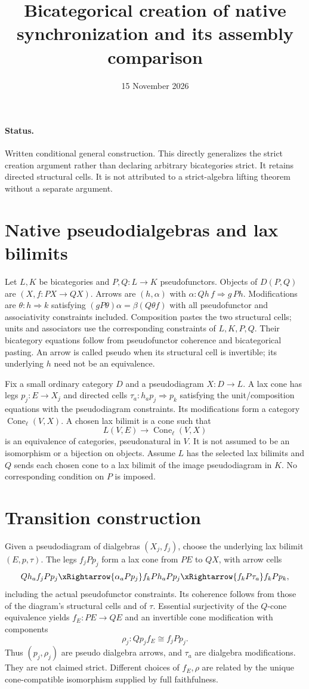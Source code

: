 \documentclass{article}
\title{Bicategorical creation of native synchronization and its assembly comparison}
\date{15 November 2026}
\begin{document}
\maketitle
\paragraph{Status.} Written conditional general construction. This directly generalizes the strict creation argument rather than declaring arbitrary bicategories strict. It retains directed structural cells. It is not attributed to a strict-algebra lifting theorem without a separate argument.

\section{Native pseudodialgebras and lax bilimits}
Let $L,K$ be bicategories and $P,Q:L\to K$ pseudofunctors. Objects of $D(P,Q)$ are $(X,f:PX\to QX)$. Arrows are $(h,\alpha)$ with $\alpha:Qh\,f\Rightarrow g\,Ph$. Modifications are $\theta:h\Rightarrow k$ satisfying $(gP\theta)\alpha=\beta(Q\theta f)$ with all pseudofunctor and associativity constraints included. Composition pastes the two structural cells; units and associators use the corresponding constraints of $L,K,P,Q$. Their bicategory equations follow from pseudofunctor coherence and bicategorical pasting. An arrow is called pseudo when its structural cell is invertible; its underlying $h$ need not be an equivalence.

Fix a small ordinary category $D$ and a pseudodiagram $X:D\to L$. A lax cone has legs $p_j:E\to X_j$ and directed cells $\tau_a:h_ap_j\Rightarrow p_k$ satisfying the unit/composition equations with the pseudodiagram constraints. Its modifications form a category $\operatorname{Cone}_{\ell}(V,X)$. A chosen lax bilimit is a cone such that
\[
L(V,E)\longrightarrow\operatorname{Cone}_{\ell}(V,X)
\]
is an equivalence of categories, pseudonatural in $V$. It is not assumed to be an isomorphism or a bijection on objects. Assume $L$ has the selected lax bilimits and $Q$ sends each chosen cone to a lax bilimit of the image pseudodiagram in $K$. No corresponding condition on $P$ is imposed.

\section{Transition construction}
Given a pseudodiagram of dialgebras $(X_j,f_j)$, choose the underlying lax bilimit $(E,p,\tau)$. The legs $f_jPp_j$ form a lax cone from $PE$ to $QX$, with arrow cells
\[
Qh_a f_jPp_j\xRightarrow{\alpha_aPp_j}
 f_kPh_aPp_j\xRightarrow{f_kP\tau_a}f_kPp_k,
\]
including the actual pseudofunctor constraints. Its coherence follows from those of the diagram's structural cells and of $\tau$. Essential surjectivity of the $Q$-cone equivalence yields $f_E:PE\to QE$ and an invertible cone modification with components
\[
\rho_j:Qp_j f_E\cong f_jPp_j.
\]
Thus $(p_j,\rho_j)$ are pseudo dialgebra arrows, and $\tau_a$ are dialgebra modifications. They are not claimed strict. Different choices of $f_E,\rho$ are related by the unique cone-compatible isomorphism supplied by full faithfulness.
\end{document}
